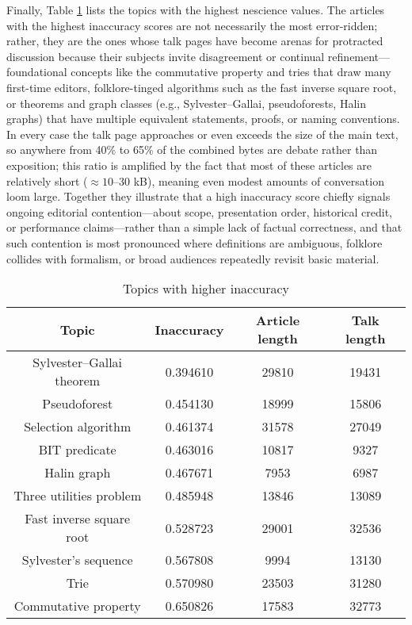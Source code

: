 Finally, Table \ref{tab:Higher-inaccuracy-of-topics} lists the topics with the highest nescience values. The articles with the highest inaccuracy scores are not necessarily the most error-ridden; rather, they are the ones whose talk pages have become arenas for protracted discussion because their subjects invite disagreement or continual refinement—foundational concepts like the commutative property and tries that draw many first-time editors, folklore-tinged algorithms such as the fast inverse square root, or theorems and graph classes (e.g., Sylvester–Gallai, pseudoforests, Halin graphs) that have multiple equivalent statements, proofs, or naming conventions.  In every case the talk page approaches or even exceeds the size of the main text, so anywhere from 40\% to 65\% of the combined bytes are debate rather than exposition; this ratio is amplified by the fact that most of these articles are relatively short ($\approx 10–30$ kB), meaning even modest amounts of conversation loom large.  Together they illustrate that a high inaccuracy score chiefly signals ongoing editorial contention—about scope, presentation order, historical credit, or performance claims—rather than a simple lack of factual correctness, and that such contention is most pronounced where definitions are ambiguous, folklore collides with formalism, or broad audiences repeatedly revisit basic material.

\begin{table}
\begin{centering}
\begin{tabular}{|c|c|c|c|}
\hline 
Topic & Inaccuracy & Article length & Talk length \tabularnewline
\hline 
\hline 
Sylvester–Gallai theorem & 0.394610 & 29810 & 19431 \tabularnewline
\hline
Pseudoforest & 0.454130 & 18999 & 15806 \tabularnewline
\hline
Selection algorithm & 0.461374 & 31578 & 27049 \tabularnewline
\hline
BIT predicate & 0.463016 & 10817 & 9327 \tabularnewline
\hline
Halin graph & 0.467671 & 7953 & 6987 \tabularnewline
\hline
Three utilities problem & 0.485948 & 13846 & 13089 \tabularnewline
\hline
Fast inverse square root & 0.528723 & 29001 & 32536 \tabularnewline
\hline
Sylvester's sequence & 0.567808 & 9994 & 13130 \tabularnewline
\hline
Trie & 0.570980 & 23503 & 31280 \tabularnewline
\hline
Commutative property & 0.650826 & 17583 & 32773 \tabularnewline
\hline 
\end{tabular}
\par\end{centering}
\caption{\label{tab:Higher-inaccuracy-of-topics}Topics with higher inaccuracy}
\end{table}

